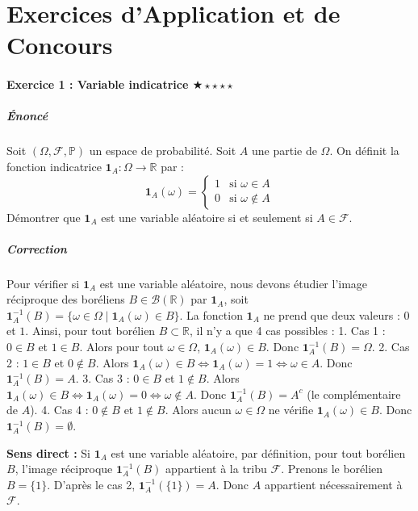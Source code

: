 \documentclass[11pt,a4paper]{article}
\begin{document}
\newpage
\part{Exercices d'Application et de Concours}
\subsection*{Exercice 1 : Variable indicatrice \quad $\bigstar\star\star\star\star$}

\subsubsection*{Énoncé}

Soit $(\Omega, \mathcal{F}, \mathbb{P})$ un espace de probabilité. Soit $A$ une partie de $\Omega$. On définit la fonction indicatrice $\mathbf{1}_A : \Omega \to \mathbb{R}$ par :
$$ \mathbf{1}_A(\omega) = \begin{cases} 1 & \text{si } \omega \in A \\ 0 & \text{si } \omega \notin A \end{cases} $$
Démontrer que $\mathbf{1}_A$ est une variable aléatoire si et seulement si $A \in \mathcal{F}$.

\subsubsection*{Correction}

Pour vérifier si $\mathbf{1}_A$ est une variable aléatoire, nous devons étudier l'image réciproque des boréliens $B \in \mathcal{B}(\mathbb{R})$ par $\mathbf{1}_A$, soit $\mathbf{1}_A^{-1}(B) = \{\omega \in \Omega \mid \mathbf{1}_A(\omega) \in B\}$.
La fonction $\mathbf{1}_A$ ne prend que deux valeurs : $0$ et $1$. Ainsi, pour tout borélien $B \subset \mathbb{R}$, il n'y a que 4 cas possibles :
1. Cas 1 : $0 \in B$ et $1 \in B$. Alors pour tout $\omega \in \Omega$, $\mathbf{1}_A(\omega) \in B$. Donc $\mathbf{1}_A^{-1}(B) = \Omega$.
2. Cas 2 : $1 \in B$ et $0 \notin B$. Alors $\mathbf{1}_A(\omega) \in B \iff \mathbf{1}_A(\omega) = 1 \iff \omega \in A$. Donc $\mathbf{1}_A^{-1}(B) = A$.
3. Cas 3 : $0 \in B$ et $1 \notin B$. Alors $\mathbf{1}_A(\omega) \in B \iff \mathbf{1}_A(\omega) = 0 \iff \omega \notin A$. Donc $\mathbf{1}_A^{-1}(B) = A^c$ (le complémentaire de $A$).
4. Cas 4 : $0 \notin B$ et $1 \notin B$. Alors aucun $\omega \in \Omega$ ne vérifie $\mathbf{1}_A(\omega) \in B$. Donc $\mathbf{1}_A^{-1}(B) = \emptyset$.

\textbf{Sens direct :} Si $\mathbf{1}_A$ est une variable aléatoire, par définition, pour tout borélien $B$, l'image réciproque $\mathbf{1}_A^{-1}(B)$ appartient à la tribu $\mathcal{F}$. Prenons le borélien $B = \{1\}$. D'après le cas 2, $\mathbf{1}_A^{-1}(\{1\}) = A$. Donc $A$ appartient nécessairement à $\mathcal{F}$.
\end{document}
